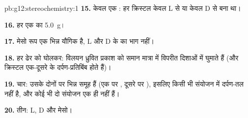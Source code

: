 \begin{solution}{pb:g12:stereochemistry:1}
\textbf{15.} केवल एक : हर क्रिस्टल केवल L से या केवल D से
बना था।

\textbf{16.} हर एक का \qty{5.0}{g}।

\textbf{17.} मेसो रूप एक भिन्न यौगिक है, L और D के  का भाग नहीं।

\textbf{18.} हर ढेर को घोलकर: विलयन ध्रुवित प्रकाश को
समान मात्रा में विपरीत दिशाओं में घुमाते हैं (और क्रिस्टल एक-दूसरे के दर्पण-प्रतिबिंब
होते हैं)।

\textbf{19.} चार: उसके दोनों  पर भिन्न समूह हैं
(एक पर , दूसरे पर ), इसलिए किसी भी संयोजन में दर्पण-तल
नहीं है, और कोई भी दो संयोजन एक ही  नहीं हैं।

\textbf{20.} तीन: L, D और मेसो।
\end{solution}

